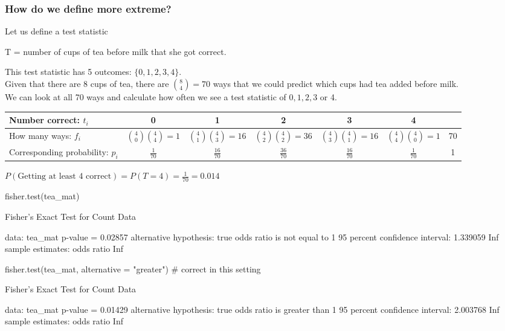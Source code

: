 \documentclass[a4paper]{article}\usepackage[]{graphicx}\usepackage[]{xcolor}
\begin{document}
\subsubsection{How do we define more extreme?}
Let us define a test statistic
\begin{center}
	T = number of cups of tea before milk that she got correct.
\end{center}
This test statistic has 5 outcomes: \( \{0,1,2,3,4\} \).\\
Given that there are 8 cups of tea, there are \( \binom{8}{4} = 70 \) ways that we could predict which cups had tea added before milk.\\
We can look at all 70 ways and calculate how often we see a test statistic of \( 0,1,2,3 \) or 4.
\begin{table}[H]
	\begin{tabular}{@{}l|ccccc|c@{}}
	Number correct: \( t_i \)            & 0 								  & 1                                   & 2                                  & 3 & 4 &  \\ \midrule
	How many ways:  \( f_i \)            & \( \binom{4}{0}\binom{4}{4} = 1 \) & \( \binom{4}{1}\binom{4}{3} = 16 \) & \( \binom{4}{2}\binom{4}{2} =36 \) & \( \binom{4}{3}\binom{4}{1} = 16 \) &  \( \binom{4}{4}\binom{4}{0} = 1 \) & 70 \\
	Corresponding probability: \( p_i \) & \( \frac{1}{70} \)                 & \( \frac{16}{70} \)                 & \( \frac{36}{70} \)                & \(\frac{16}{70} \) & \( \frac{1}{70} \) & 1 \\ \bottomrule
	\end{tabular}
\end{table}
\( P(\text{Getting at least 4 correct}) = P(T = 4) = \frac{1}{70} = 0.014 \) 
\begin{Schunk}
\begin{Sinput}
fisher.test(tea_mat)
\end{Sinput}
\begin{Soutput}

	Fisher's Exact Test for Count Data

data:  tea_mat
p-value = 0.02857
alternative hypothesis: true odds ratio is not equal to 1
95 percent confidence interval:
 1.339059      Inf
sample estimates:
odds ratio 
       Inf 
\end{Soutput}
\begin{Sinput}
fisher.test(tea_mat, alternative = "greater") # correct in this setting
\end{Sinput}
\begin{Soutput}

	Fisher's Exact Test for Count Data

data:  tea_mat
p-value = 0.01429
alternative hypothesis: true odds ratio is greater than 1
95 percent confidence interval:
 2.003768      Inf
sample estimates:
odds ratio 
       Inf 
\end{Soutput}
\end{Schunk}
\end{document}
